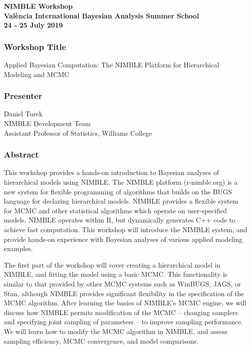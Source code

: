 \documentclass[11pt]{article}
\begin{document}
\thispagestyle{empty}

\begin{center}
{\Large {\bf NIMBLE Workshop}} \\
{\normalsize {\bf Val\`{e}ncia International Bayesian Analysis Summer School}} \\
{\normalsize {\bf 24 - 25 July 2019}}
\end{center}


\vspace{0.1 in}


\subsubsection*{Workshop Title}

Applied Bayesian Computation: The NIMBLE Platform for Hierarchical Modeling and MCMC

\vspace{0.1 in}

\subsubsection*{Presenter}

Daniel Turek \\
NIMBLE Development Team \\ 
Assistant Professor of Statistics, Williams College

\vspace{0.1 in}



\subsubsection*{Abstract}

This workshop provides a hands-on introduction to Bayesian analyses of hierarchical models using NIMBLE.  The NIMBLE platform (r-nimble.org) is a new system for flexible programming of algorithms that builds on the BUGS language for declaring hierarchical models. NIMBLE provides a flexible system for MCMC and other statistical algorithms which operate on user-specified models.  NIMBLE operates within R, but dynamically generates C++ code to achieve fast computation.  This workshop will introduce the NIMBLE system, and provide hands-on experience with Bayesian analyses of various applied modeling examples. 

The first part of the workshop will cover creating a hierarchical model in NIMBLE, and fitting the model using a basic MCMC. This functionality is similar to that provided by other MCMC systems such as WinBUGS, JAGS, or Stan, although NIMBLE provides significant flexibility in the specification of the MCMC algorithm.  After learning the basics of NIMBLE's MCMC engine, we will discuss how NIMBLE permits modification of the MCMC -- changing samplers and specifying joint sampling of parameters -- to improve sampling performance.   We will learn how to modify the MCMC algorithm in NIMBLE, and assess sampling efficiency, MCMC convergence, and model comparisons.
\end{document}

